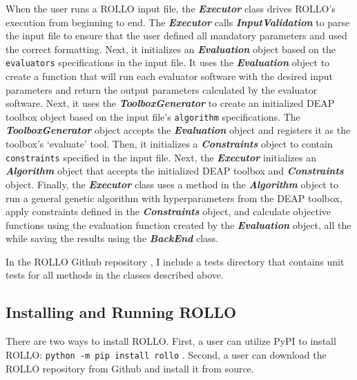 When the user runs a \gls{ROLLO} input file, the \textbf{\textit{Executor}} class 
drives \gls{ROLLO}'s execution from beginning to end.
The \textbf{\textit{Executor}} calls \textbf{\textit{InputValidation}} to 
parse the input file to ensure that the user defined all mandatory parameters
and used the correct formatting.
Next, it initializes an \textbf{\textit{Evaluation}} object based on the 
\texttt{evaluators} specifications in the input file. 
It uses the \textbf{\textit{Evaluation}} object to create a function that will 
run each evaluator software with the desired input parameters and return the 
output parameters calculated by the evaluator software. 
Next, it uses the \textbf{\textit{ToolboxGenerator}} to create an initialized 
DEAP toolbox object based on the input file's \texttt{algorithm} specifications. 
The \textbf{\textit{ToolboxGenerator}} object accepts the 
\textbf{\textit{Evaluation}} object and registers it as the toolbox's `evaluate' 
tool.  
Then, it initializes a \textbf{\textit{Constraints}} object to contain 
\texttt{constraints} specified in the input file. 
Next, the \textbf{\textit{Executor}} initializes an \textbf{\textit{Algorithm}} 
object that accepts the initialized \gls{DEAP} toolbox and \textbf{\textit{Constraints}} 
object. 
Finally, the \textbf{\textit{Executor}} class uses a method in the 
\textbf{\textit{Algorithm}} object to run a general genetic algorithm with 
hyperparameters from the \gls{DEAP} toolbox, apply constraints defined in the 
\textbf{\textit{Constraints}} object, and calculate objective functions using 
the evaluation function created by the \textbf{\textit{Evaluation}} object, all 
the while saving the results using the \textbf{\textit{BackEnd}} class. 

In the \gls{ROLLO} Github repository \cite{chee_rollo_2021}, I include a tests 
directory that contains unit tests for all methods in the classes described 
above. 

\subsection{Installing and Running \gls{ROLLO}}
There are two ways to install \gls{ROLLO}.
First, a user can utilize \gls{PyPI} to install \gls{ROLLO}: \texttt{python -m 
pip install rollo}
\cite{chee_rollo_2021}.
Second, a user can download the \gls{ROLLO} repository \cite{chee_rollo_2021}
from Github and install it from source. 

